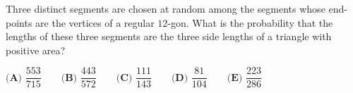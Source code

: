 Three distinct segments are chosen at random among the segments whose end-points are the vertices of a regular $12$-gon. What is the probability that the lengths of these three segments are the three side lengths of a triangle with positive area?

$\textbf{(A) }\dfrac{553}{715}\qquad\textbf{(B) }\dfrac{443}{572}\qquad\textbf{(C) }\dfrac{111}{143}\qquad\textbf{(D) }\dfrac{81}{104}\qquad\textbf{(E) }\dfrac{223}{286}$
